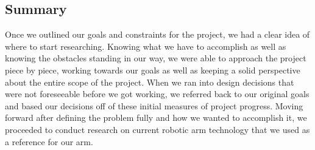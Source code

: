\subsection{Summary}
\noindent Once we outlined our goals and constraints for the project, we had a clear idea of where to start researching. Knowing what we have to accomplish as well as knowing the obstacles standing in our way, we were able to approach the project piece by piece, working towards our goals as well as keeping a solid perspective about the entire scope of the project. When we ran into design decisions that were not foreseeable before we got working, we referred back to our original goals and based our decisions off of these initial measures of project progress. Moving forward after defining the problem fully and how we wanted to accomplish it, we proceeded to conduct research on current robotic arm technology that we used as a reference for our arm.  

